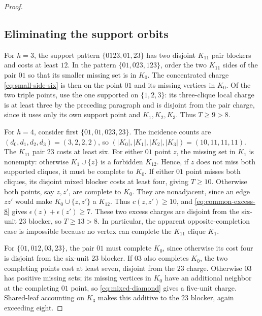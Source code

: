 \begin{proof}
\subsection*{Eliminating the support orbits}

For $h=3$, the support pattern $\{0123,01,23\}$ has two disjoint $K_{11}$ pair blockers and costs at least $12$. In the pattern $\{01,023,123\}$, order the two $K_{11}$ sides of the pair $01$ so that its smaller missing set is in $K_0$. The concentrated charge \eqref{eq:small-side-six} is then on the point $01$ and its missing vertices in $K_0$. Of the two triple points, use the one supported on $\{1,2,3\}$: its three-clique local charge is at least three by the preceding paragraph and is disjoint from the pair charge, since it uses only its own support point and $K_1,K_2,K_3$. Thus $T\geq9>8$.

For $h=4$, consider first $\{01,01,023,23\}$. The incidence counts are $(d_0,d_1,d_2,d_3)=(3,2,2,2)$, so $(|K_0|,|K_1|,|K_2|,|K_3|)=(10,11,11,11)$. The $K_{11}$ pair $23$ costs at least six. For either $01$ point $z$, the missing set in $K_1$ is nonempty: otherwise $K_1\cup\{z\}$ is a forbidden $K_{12}$. Hence, if $z$ does not miss both supported cliques, it must be complete to $K_0$. If either $01$ point misses both cliques, its disjoint mixed blocker costs at least four, giving $T\geq10$. Otherwise both points, say $z,z'$, are complete to $K_0$. They are nonadjacent, since an edge $zz'$ would make $K_0\cup\{z,z'\}$ a $K_{12}$. Thus $c(z,z')\geq10$, and \eqref{eq:common-excess-8} gives $\epsilon(z)+\epsilon(z')\geq7$. These two excess charges are disjoint from the six-unit $23$ blocker, so $T\geq13>8$. In particular, the apparent opposite-completion case is impossible because no vertex can complete the $K_{11}$ clique $K_1$.

For $\{01,012,03,23\}$, the pair $01$ must complete $K_0$, since otherwise its cost four is disjoint from the six-unit $23$ blocker. If $03$ also completes $K_0$, the two completing points cost at least seven, disjoint from the $23$ charge. Otherwise $03$ has positive missing sets; its missing vertices in $K_0$ have an additional neighbor at the completing $01$ point, so \eqref{eq:mixed-diamond} gives a five-unit charge. Shared-leaf accounting on $K_3$ makes this additive to the $23$ blocker, again exceeding eight.


\end{proof}
